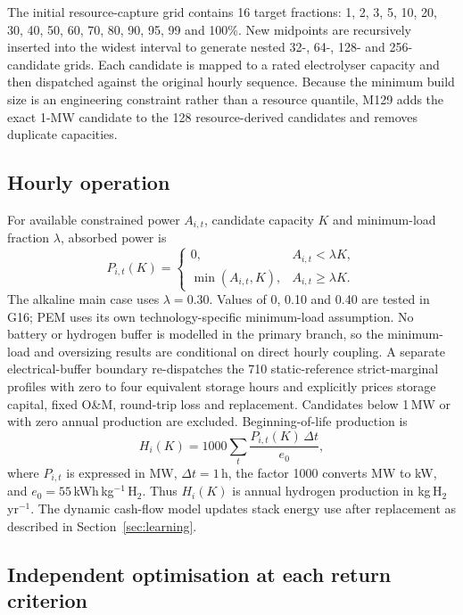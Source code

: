 \documentclass[pdflatex,sn-nature]{sn-jnl}
\begin{document}
The initial resource-capture grid contains 16 target fractions: 1, 2, 3, 5, 10, 20, 30, 40, 50, 60, 70, 80, 90, 95, 99 and 100\%. New midpoints are recursively inserted into the widest interval to generate nested 32-, 64-, 128- and 256-candidate grids. Each candidate is mapped to a rated electrolyser capacity and then dispatched against the original hourly sequence. Because the minimum build size is an engineering constraint rather than a resource quantile, M129 adds the exact 1-MW candidate to the 128 resource-derived candidates and removes duplicate capacities.

\subsection{Hourly operation}

For available constrained power $A_{i,t}$, candidate capacity $K$ and minimum-load fraction $\lambda$, absorbed power is
\begin{equation}
P_{i,t}(K)=
\begin{cases}
0, & A_{i,t}<\lambda K,\\
\min(A_{i,t},K), & A_{i,t}\geq \lambda K.
\end{cases}
\label{eq:dispatch}
\end{equation}
The alkaline main case uses $\lambda=0.30$. Values of 0, 0.10 and 0.40 are tested in G16; PEM uses its own technology-specific minimum-load assumption. No battery or hydrogen buffer is modelled in the primary branch, so the minimum-load and oversizing results are conditional on direct hourly coupling. A separate electrical-buffer boundary re-dispatches the 710 static-reference strict-marginal profiles with zero to four equivalent storage hours and explicitly prices storage capital, fixed O\&M, round-trip loss and replacement. Candidates below 1\,MW or with zero annual production are excluded. Beginning-of-life production is
\begin{equation}
H_i(K)=1000\sum_t \frac{P_{i,t}(K)\,\Delta t}{e_0},
\label{eq:h2}
\end{equation}
where $P_{i,t}$ is expressed in MW, $\Delta t=1$\,h, the factor 1000 converts MW to kW, and $e_0=55$\,kWh\,kg$^{-1}$\,H$_2$. Thus $H_i(K)$ is annual hydrogen production in kg\,H$_2$\,yr$^{-1}$. The dynamic cash-flow model updates stack energy use after replacement as described in Section~\ref{sec:learning}.

\subsection{Independent optimisation at each return criterion}
\end{document}
